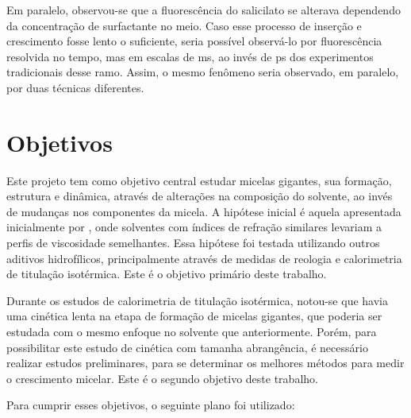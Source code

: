 		Em paralelo, observou-se que a fluorescência do salicilato se alterava dependendo da concentração de surfactante no meio. Caso esse processo de inserção e crescimento fosse lento o suficiente, seria possível observá-lo por fluorescência resolvida no tempo, mas em escalas de ms, ao invés de ps dos experimentos tradicionais desse ramo. Assim, o mesmo fenômeno seria observado, em paralelo, por duas técnicas diferentes.
			
	\chapter{Objetivos}
		
		Este projeto tem como objetivo central estudar micelas gigantes, sua formação, estrutura e dinâmica, através de alterações na composição do solvente, ao invés de mudanças nos componentes da micela. A hipótese inicial é aquela apresentada inicialmente por \citeauthor{Hoffmann2010}, onde solventes com índices de refração similares levariam a perfis de viscosidade semelhantes. Essa hipótese foi testada utilizando outros aditivos hidrofílicos, principalmente através de medidas de reologia e calorimetria de titulação isotérmica. Este é o objetivo primário deste trabalho.
		
		Durante os estudos de calorimetria de titulação isotérmica, notou-se que havia uma cinética lenta na etapa de formação de micelas gigantes, que poderia ser estudada com o mesmo enfoque no solvente que anteriormente. Porém, para possibilitar este estudo de cinética com tamanha abrangência, é necessário realizar estudos preliminares, para se determinar os melhores métodos para medir o crescimento micelar. Este é o segundo objetivo deste trabalho.
		
		Para cumprir esses objetivos, o seguinte plano foi utilizado:
		
